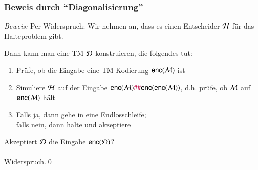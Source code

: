 \documentclass[onlymath]{beamer}
\begin{document}
\begin{frame}[t]\frametitle{Beweis durch "`Diagonalisierung"'}

\pause

\emph{Beweis:} Per Widerspruch: Wir nehmen an, dass es einen Entscheider $\mathcal{H}$ für das Halteproblem gibt.\pause
\bigskip

Dann kann man eine TM $\mathcal{D}$ konstruieren, die folgendes tut:
\begin{enumerate}[(1)]
\item Prüfe, ob die Eingabe eine TM-Kodierung $\textsf{enc}(\mathcal{M})$ ist
\item Simuliere $\mathcal{H}$ auf der Eingabe $\textsf{enc}(\mathcal{M})\mathtt{\textcolor{purple}{\#\#}}\textsf{enc}(\textsf{enc}(\mathcal{M}))$, d.h. prüfe, ob $\mathcal{M}$ auf $\textsf{enc}(\mathcal{M})$ hält
\item Falls ja, dann gehe in eine Endlosschleife;\\ falls nein, dann halte und akzeptiere
\end{enumerate}
\bigskip\pause

\alert{Akzeptiert $\mathcal{D}$ die Eingabe $\textsf{enc}(\mathcal{D})$?}\pause\\[1ex]

\\[1ex]

Widerspruch.\qed

\end{frame}
\end{document}
